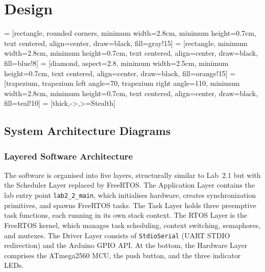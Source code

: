 \section{Design}

 = [rectangle, rounded corners, minimum width=2.8cm,
    minimum height=0.7cm, text centered, align=center, draw=black, fill=gray!15]
   = [rectangle, minimum width=2.8cm,
    minimum height=0.7cm, text centered, align=center, draw=black, fill=blue!8]
  = [diamond, aspect=2.8, minimum width=2.5cm,
    minimum height=0.7cm, text centered, align=center, draw=black, fill=orange!15]
        = [trapezium, trapezium left angle=70, trapezium right angle=110,
    minimum width=2.8cm, minimum height=0.7cm, text centered, align=center, draw=black, fill=teal!10]
     = [thick,->,>=Stealth]

\subsection{System Architecture Diagrams}

\subsubsection{Layered Software Architecture}

The software is organised into five layers, structurally similar to Lab~2.1 but with the Scheduler Layer replaced by FreeRTOS. The Application Layer contains the lab entry point \texttt{lab2\_2\_main}, which initialises hardware, creates synchronization primitives, and spawns FreeRTOS tasks. The Task Layer holds three preemptive task functions, each running in its own stack context. The RTOS Layer is the FreeRTOS kernel, which manages task scheduling, context switching, semaphores, and mutexes. The Driver Layer consists of \texttt{StdioSerial} (UART STDIO redirection) and the Arduino GPIO API. At the bottom, the Hardware Layer comprises the ATmega2560 MCU, the push button, and the three indicator LEDs.

